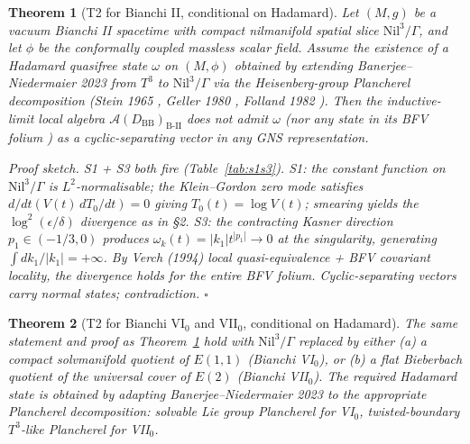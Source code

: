 \documentclass[11pt,a4paper]{article}
\newtheorem{theorem}{Theorem}
\theoremstyle{definition}
\newcommand{\AAA}{\mathcal{A}}
\newcommand{\BII}{\mathrm{B\text{-}II}}
\newcommand{\BB}{\mathrm{BB}}
\begin{document}
\begin{theorem}[T2 for Bianchi II, conditional on Hadamard]\label{thm:BII}
Let $(M, g)$ be a vacuum Bianchi II spacetime with compact nilmanifold
spatial slice $\mathrm{Nil}^3 / \Gamma$, and let $\phi$ be the conformally
coupled massless scalar field. Assume the existence of a Hadamard quasifree
state $\omega$ on $(M, \phi)$ obtained by extending Banerjee--Niedermaier
2023 \cite{BN2023} from $T^3$ to $\mathrm{Nil}^3 / \Gamma$ via the
Heisenberg-group Plancherel decomposition (Stein 1965 \cite{Stein1965},
Geller 1980 \cite{Geller1980}, Folland 1982 \cite{Folland1982}). Then the
inductive-limit local algebra $\AAA(D_\BB)_\BII$ does not admit $\omega$
(nor any state in its BFV folium \cite{BFV2003}) as a cyclic-separating
vector in any GNS representation.

\noindent
\emph{Proof sketch.} S1 + S3 both fire (Table~\ref{tab:s1s3}). S1: the
constant function on $\mathrm{Nil}^3 / \Gamma$ is $L^2$-normalisable; the
Klein--Gordon zero mode satisfies $d/dt(V(t)\,dT_0/dt) = 0$ giving
$T_0(t) = \log V(t)$; smearing yields the $\log^2(\epsilon/\delta)$
divergence as in \cite{T2BI} \S2. S3: the contracting Kasner direction
$p_1 \in (-1/3, 0)$ produces $\omega_k(t) = |k_1| t^{|p_1|} \to 0$ at the
singularity, generating $\int dk_1/|k_1| = +\infty$. By Verch (1994)
\cite{Verch1994} local quasi-equivalence + BFV \cite{BFV2003} covariant
locality, the divergence holds for the entire BFV folium. Cyclic-separating
vectors carry normal states; contradiction. $\square$
\end{theorem}

\begin{theorem}[T2 for Bianchi VI$_0$ and VII$_0$, conditional on Hadamard]\label{thm:BVIVII}
The same statement and proof as Theorem~\ref{thm:BII} hold with
$\mathrm{Nil}^3 / \Gamma$ replaced by either (a) a compact solvmanifold quotient
of $E(1,1)$ (Bianchi VI$_0$), or (b) a flat Bieberbach quotient of
the universal cover of $E(2)$ (Bianchi VII$_0$). The required Hadamard
state is obtained by adapting Banerjee--Niedermaier 2023 \cite{BN2023} to
the appropriate Plancherel decomposition: solvable Lie group Plancherel for
VI$_0$, twisted-boundary $T^3$-like Plancherel for VII$_0$.
\end{theorem}
\end{document}
